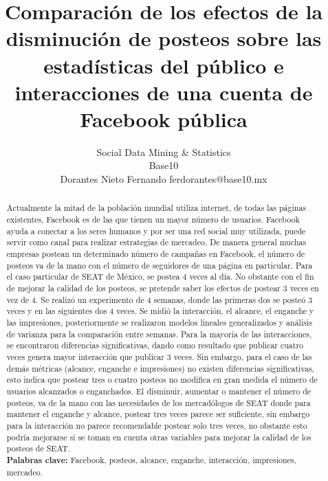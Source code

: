 \documentclass[a4paper,10pt]{article}
\title{Comparación de los efectos de la disminución de posteos sobre las estadísticas del público e interacciones de 
una cuenta de Facebook pública}
\author{Social Data Mining \& Statistics \\
        Base10\\
        \scriptsize Dorantes Nieto Fernando ferdorantes@base10.mx}
\date{}
\begin{document}
\maketitle

\begin{abstract}

Actualmente la mitad de la población mundial utiliza internet, de
todas las páginas existentes, Facebook es de las que tienen un mayor número
de usuarios. Facebook ayuda a conectar a los seres humanos y por 
ser una red social muy utilizada, puede servir como canal para
realizar estrategias de mercadeo.
De manera general muchas empresas postean un determinado número de 
campañas en Facebook, el número de posteos va de la mano con el número
de seguidores de una página en particular.
Para el caso particular de SEAT de México, se postea 4 veces al día.
No obstante con el fin de mejorar la calidad de los posteos, se pretende saber 
los efectos de postear 3 veces en vez de 4.
Se realizó un experimento de 4 semanas, donde las primeras dos se
posteó 3 veces y en las siguientes dos 4 veces. 
Se midió la interacción, el alcance, el enganche y las impresiones, posteriormente se realizaron 
modelos lineales generalizados y análisis de varianza para la comparación entre semanas.
Para la mayoría de las interacciones, se encontraron diferencias significativas,
dando como resultado que publicar cuatro veces genera mayor interacción que publicar 3 veces.
Sin embargo, para el caso de las demás métricas (alcance, enganche e impresiones) no 
existen diferencias significativas, esto indica que postear tres o cuatro posteos
no modifica en gran medida el número de usuarios alcanzados o enganchados.
El disminuir, aumentar o mantener el número de posteos, va de la mano con las necesidades de los mercadólogos de
SEAT donde para mantener el enganche y alcance, postear tres veces parece ser suficiente, 
sin embargo para la interacción no parece recomendable postear solo tres veces, no obstante esto 
podría mejorarse si se toman en cuenta otras variables para mejorar la calidad de los posteos de SEAT.\\
\textbf{Palabras clave:}  Facebook, posteos, alcance, enganche, interacción, impresiones, mercadeo.

\end{abstract} 
  \\[-2cm]
\end{document}
